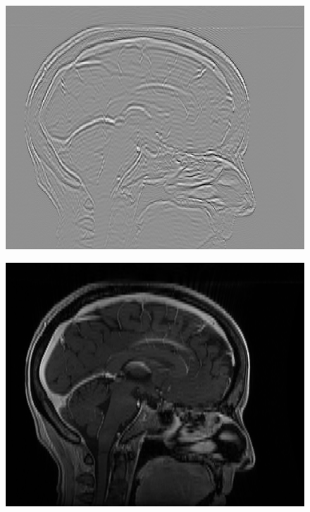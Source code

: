\documentclass[fleqn,a4paper,oneside,openany]{book}
\begin{document}
\begin{figure}
\begin{minipage}[b]{140pt}
     \label{fig:radiomics_filter_1mm_low_pass}
     \hspace{100pt}
   \end{minipage}
   \begin{minipage}[b]{140pt}
     \centering
     \includegraphics[trim = 0 0 0 0, clip, scale=0.38]{radiomics_filtering/filtered_image_1mm_spacing_hi.png}
     \label{fig:radiomics_filter_1mm_high_pass}
     \hspace{100pt}
   \end{minipage}
   \begin{minipage}[b]{140pt}
     \centering
     \includegraphics[trim = 0 0 0 0, clip, scale=0.38]{radiomics_filtering/filtered_image_2mm_spacing_none.png}

\end{minipage}
\end{figure}
\end{document}
